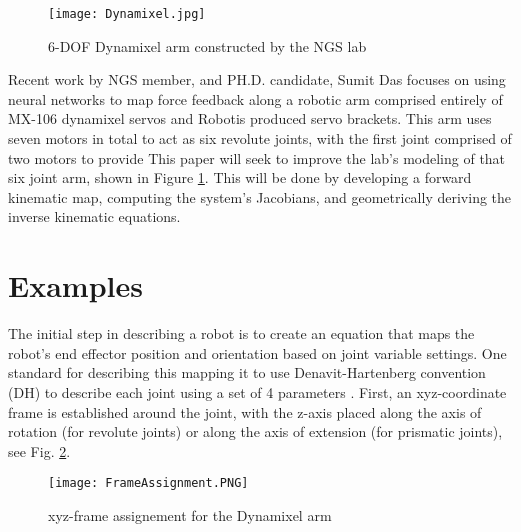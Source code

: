 \documentclass[10pt,journal]{IEEEtran}
\begin{document}
\begin{figure}[ht!]
\centering
\texttt{[image: Dynamixel.jpg]}
\caption{6-DOF Dynamixel arm constructed by the NGS lab} 
\label{fig:DynamixelPhoto}
\end{figure}

\par Recent work by NGS member, and PH.D. candidate, Sumit Das focuses on using neural networks to map force feedback along a robotic arm comprised entirely of MX-106 dynamixel servos and Robotis produced servo brackets. This arm uses seven motors in total to act as six revolute joints, with the first joint comprised of two motors to provide  This paper will seek to improve the lab's modeling of that six joint arm, shown in Figure \ref{fig:DynamixelPhoto}. This will be done by developing a forward kinematic map, computing the system's Jacobians, and geometrically deriving the inverse kinematic equations. 

\section{Examples} %
The initial step in describing a robot is to create an equation that maps the robot's end effector position and orientation based on joint variable settings. One standard for describing this mapping it to use Denavit-Hartenberg convention (DH) to describe each joint using a set of 4 parameters \cite{siciliano2009robotics}. First, an xyz-coordinate frame is established around the joint, with the z-axis placed along the axis of rotation (for revolute joints) or along the axis of extension (for prismatic joints), see Fig. \ref{fig:frameAssignment}. 

\begin{figure}[ht!]
\texttt{[image: FrameAssignment.PNG]}
\caption{xyz-frame assignement for the Dynamixel arm}
\label{fig:frameAssignment}
\end{figure}
\end{document}
